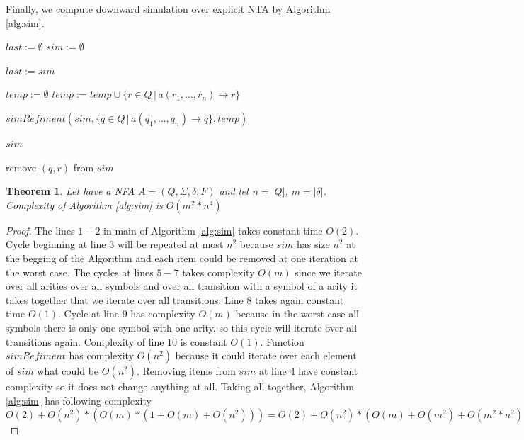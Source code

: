 \documentclass[a4paper, 12pt]{article}
\let\oldnl\nl%
\newcommand{\nonl}{\renewcommand{\nl}{\let\nl\oldnl}}%
\newtheorem{theorem}{Theorem}
\begin{document}
Finally, we compute downward simulation over explicit NTA by Algorithm \ref{alg:sim}.
\begin{algorithm}[h]
\label{alg:sim}
    
	$last := \emptyset $\;
    $sim := \emptyset $\;
	{
		$last := sim$\;
		{
			{
				{
					$temp := \emptyset$\;
					{
						$temp := temp \cup \{r \in Q \,|\, a(r_1,\ldots, r_n) \rightarrow r\}$\;
					}

					$simRefiment(sim, \{q \in Q \,|\, a(q_1,\ldots, q_n) \rightarrow q\}, temp)$\;
				}
			}
		}

	}
	\Return $sim$\;
	\DontPrintSemicolon \nonl\;
	\setcounter{AlgoLine}{0}

	\nonl {}
	{
		{
			{
				{
					remove $(q,r)$ from $sim$ \;
				}
			}
		}
	 }
	 \caption{Computing simulation on a NTA. The algorithm is based on the one in \cite{lengal:trees}}
\end{algorithm}

\begin{theorem}
Let have a NFA $A = (Q, \Sigma, \delta, F)$ and let $n = |Q|$, $m = |\delta|$.
Complexity of Algorithm \ref{alg:sim} is $O(m^2*n^4)$
\end{theorem}

\begin{proof}
	The lines $1-2$ in main of Algorithm \ref{alg:sim} takes constant time $O(2)$.
	Cycle beginning at line $3$ will be repeated at most $n^2$ because $sim$ has size $n^2$ at the begging of the Algorithm
	and each item could be removed at one iteration at the worst case.
	The cycles at lines $5-7$ takes complexity $O(m)$ since we iterate over all arities over all symbols and over all transition
	with a symbol of a arity it takes together that we iterate over all transitions.
	Line $8$ takes again constant time $O(1)$.
	Cycle at line $9$ has complexity $O(m)$ because in the worst case all symbols there is only one symbol with one arity.
	so this cycle will iterate over all transitions again.
	Complexity of line $10$ is constant $O(1)$.
	Function $simRefiment$ has complexity $O(n^2)$ because it could iterate over each element of $sim$ what could be $O(n^2)$.
	Removing items from $sim$ at line $4$ have constant complexity so it does not change anything at all.
	Taking all together, Algorithm \ref{alg:sim} has following complexity 
	$O(2) + O(n^2)*(O(m)*(1+O(m)+O(n^2)))=
	O(2) + O(n^2)*(O(m)+O(m^2)+O(m^2*n^2)) =
	O(n^2)*(O(m^2*n^2)) =
	O(m^2*n^4)$
\end{proof}
\end{document}
